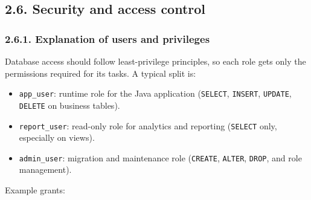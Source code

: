 \hypertarget{security-and-access-control}{%
\subsection{2.6. Security and access
control}\label{security-and-access-control}}

\hypertarget{explanation-of-users-and-privileges}{%
\subsubsection{2.6.1. Explanation of users and
privileges}\label{explanation-of-users-and-privileges}}

Database access should follow least-privilege principles, so each role
gets only the permissions required for its tasks. A typical split is:

\begin{itemize}
\tightlist
\item
  \texttt{app\_user}: runtime role for the Java application
  (\texttt{SELECT}, \texttt{INSERT}, \texttt{UPDATE}, \texttt{DELETE} on
  business tables).
\item
  \texttt{report\_user}: read-only role for analytics and reporting
  (\texttt{SELECT} only, especially on views).
\item
  \texttt{admin\_user}: migration and maintenance role (\texttt{CREATE},
  \texttt{ALTER}, \texttt{DROP}, and role management).
\end{itemize}

Example grants:

\begin{Shaded}
\begin{Highlighting}[]
  \NormalTok{;}
  \NormalTok{;}

     
 \NormalTok{, }\NormalTok{, }\NormalTok{, }       
  
\end{Highlighting}
\end{Shaded}

